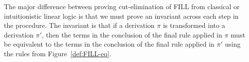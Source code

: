 The major difference between proving cut-elimination of FILL from
classical or intuitionistic linear logic is that we must prove an
invariant across each step in the procedure.  The invariant is that if
a derivation $\pi$ is transformed into a derivation $\pi'$, then the
terms in the conclusion of the final rule applied in $\pi$ must be
equivalent to the terms in the conclusion of the final rule applied in
$\pi'$ using the rules from Figure~\ref{def:FILL-eq}.


\begin{comment}
  
For example,
consider the following case in the cut-elimination procedure for FILL:

\ \\
\noindent
The proof
\begin{center}
  \scriptsize
  \begin{math}
    $$\mprset{flushleft}
    \inferrule* [right=\tiny Cut] {
      \inferrule* [right=] {
        \inferrule* [right=,vdots=1.5em,fraction=\,] {
          \,
        }{\pi_1}          
      }{[[G |- t : A | L]]}      
      \\
      $$\mprset{flushleft}
      \inferrule* [right=\tiny Parr] {
        \inferrule* [right=] {
        \inferrule* [right=,vdots=1.5em,fraction=\,] {
          \,
        }{\pi_2}          
      }{[[G1,x : A,G2 |- h(L1 | h(t1 : B | t2 : C)) | L2]]}                  
    }{[[G1,x : A,G2 |- h(L1 | h(t1 (+) t2 : B (+) C)) | L2]]}
  }{[[G1,G,G2 |- L | h(h(h([t/x]L1) | h([t/x]{t1 (+) t2} : B (+) C)) | [t/x]L2)]]}
  \end{math}
\end{center}
transforms into the proof
\begin{center}
  \scriptsize
  \begin{math}
    $$\mprset{flushleft}
\inferrule* [right=\tiny Parr] {
  $$\mprset{flushleft}
  \inferrule* [right=\tiny Cut] {
    \inferrule* [right=] {
        \inferrule* [right=,vdots=1.5em,fraction=\,] {
          \,
        }{\pi_1}          
      }{[[G |- t : A | L]]}      
      \\
      \inferrule* [right=] {
        \inferrule* [right=,vdots=1.5em,fraction=\,] {
          \,
        }{\pi_2}          
      }{[[G1,x : A,G2 |- h(L1 | h(t1 : B | t2 : C)) | L2]]}                  
    }{[[G1,G,G2 |- L | h(h(h([t/x]L1) | h(h{[t/x]t1} : B | h{[t/x]t2} : C)) | [t/x]L2)]]}
  }{[[G1,G,G2 |- L | h(h(h([t/x]L1) | h{[t/x]t1} (+) h{[t/x]t2} : B (+) C) | [t/x]L2)]]}
  \end{math}
\end{center}
Now we must show that $[[L]] = [[L]]$, $[[ [t/x]L1]] = [[ [t/x]L1]]$,
$[[ [t/x]{t1 (+) t2} = {[t/x]t1} (+) [t/x]t2]]$, and
$[[ [t/x]L2]] = [[ [t/x]L2]]$, but the only non-trivial case is
whether $[[ [t/x]{t1 (+) t2} = {[t/x]t1} (+) [t/x]t2]]$ holds, but
this clearly holds by a simple property of capture avoiding
substitution.  Every case of the cut-elimination procedure proceeds
just as this example does.
\end{comment}
